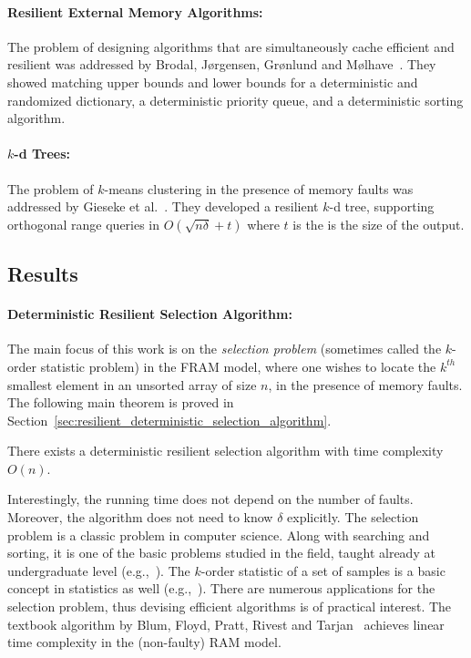 \documentclass{llncs}
\begin{document}
\paragraph{Resilient External Memory Algorithms:}

	The problem of designing algorithms that are simultaneously
	cache efficient and resilient was addressed by
	Brodal, J{\o}rgensen, Gr{\o}nlund and M{\o}lhave~\cite{resilient_and_external_memory}.
	They showed matching upper \linebreak bounds and lower bounds
	for a deterministic and randomized dictionary,
	a deterministic priority queue,
	and a deterministic sorting algorithm.

\paragraph{$k$-d Trees:}

	The problem of $k$-means clustering in the presence of memory faults
	was addressed by Gieseke et al.~\cite{kd_trees}.
	They developed a resilient $k$-d tree,
	supporting orthogonal range queries in
	$O(\sqrt{n\delta} + t)$ where $t$ is the is the size of the output.










\subsection{Results}

\paragraph{Deterministic Resilient Selection Algorithm:}

The main focus of this work is on the \emph{selection problem} (sometimes called the $k$-order statistic problem) in the FRAM model, where one wishes to locate the $k^{th}$ smallest element in an unsorted array of size $n$, in the presence of memory faults. The following main theorem is proved in Section~\ref{sec:resilient_deterministic_selection_algorithm}.

\begin{theorem}
There exists a deterministic resilient selection algorithm with time complexity $O(n)$.
\end{theorem}

Interestingly, the running time does not depend on the number of faults. Moreover, the algorithm does not need to know $\delta$ explicitly. The selection problem is a classic problem in computer science. Along with searching and sorting, it is one of the basic problems studied in the field, taught already at undergraduate level (e.g.,~\cite{CLRS}). The $k$-order statistic of a set of samples is a basic concept in statistics as well (e.g.,~\cite{order_statistics}). There are numerous applications for the selection problem, thus devising efficient algorithms is of practical interest. The textbook algorithm by Blum, Floyd, Pratt, Rivest and Tarjan~\cite{median_of_medians_algorithm}
achieves linear time complexity in the (non-faulty) RAM model.
\end{document}
